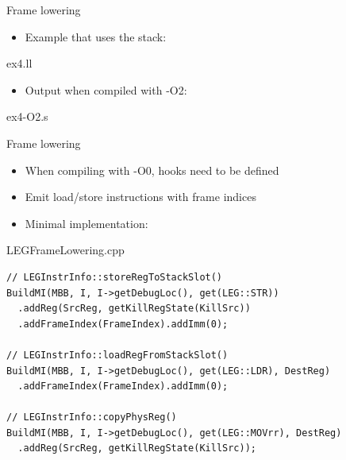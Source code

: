
\begin{frame}{Frame lowering}

\begin{itemize}
    \item Example that uses the stack:
\end{itemize}

\begin{block}{ex4.ll}

\end{block}

\begin{itemize}
    \item Output when compiled with -O2:
\end{itemize}

\begin{block}{ex4-O2.s}

\end{block}

\end{frame}


\begin{frame}[fragile]{Frame lowering}

\begin{itemize}
    \item When compiling with  -O0, hooks need to be defined
    \item Emit load/store instructions with frame indices
    \item Minimal implementation:
\end{itemize}

\begin{block}{LEGFrameLowering.cpp}
\begin{lstlisting}
// LEGInstrInfo::storeRegToStackSlot()
BuildMI(MBB, I, I->getDebugLoc(), get(LEG::STR))
  .addReg(SrcReg, getKillRegState(KillSrc))
  .addFrameIndex(FrameIndex).addImm(0);

// LEGInstrInfo::loadRegFromStackSlot()
BuildMI(MBB, I, I->getDebugLoc(), get(LEG::LDR), DestReg)
  .addFrameIndex(FrameIndex).addImm(0);

// LEGInstrInfo::copyPhysReg()
BuildMI(MBB, I, I->getDebugLoc(), get(LEG::MOVrr), DestReg)
  .addReg(SrcReg, getKillRegState(KillSrc));
\end{lstlisting}
\end{block}

\end{frame}
